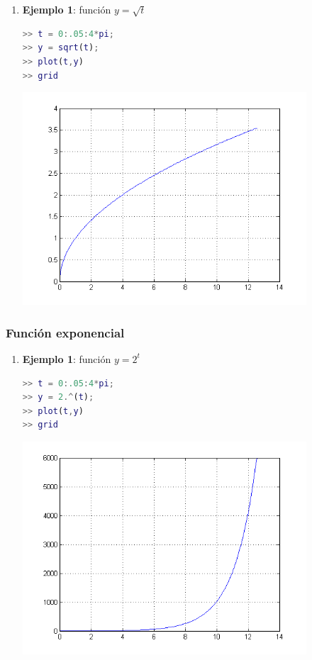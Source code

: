 \begin{enumerate}
\item \textbf{Ejemplo 1}: función $y = \sqrt{t}$
\begin{lstlisting}[language=Matlab]
>> t = 0:.05:4*pi;
>> y = sqrt(t);
>> plot(t,y)
>> grid
\end{lstlisting}
\includegraphics[width=300pt]{./Imagenes/ejem13.png}
\end{enumerate}


\subsubsection{Función exponencial}

\begin{enumerate}

\item \textbf{Ejemplo 1}: función $y = 2^{t}$
\begin{lstlisting}[language=Matlab]
>> t = 0:.05:4*pi;
>> y = 2.^(t);
>> plot(t,y)
>> grid
\end{lstlisting}
\includegraphics[width=300pt]{./Imagenes/ejem14.png}
\end{enumerate}



